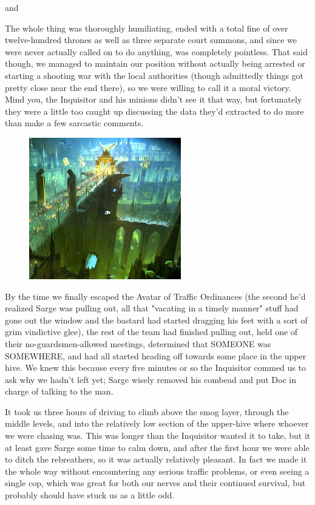 and


The whole thing was thoroughly humiliating, ended with a total fine of over twelve-hundred thrones as well as three separate court summons, and since we were never actually called on to do anything, was completely pointless. 
That said though, we managed to maintain our position without actually being arrested or starting a shooting war with the local authorities (though admittedly things got pretty close near the end there), so we were willing to call it a moral victory. 
Mind you, the Inquisitor and his minions didn't see it that way, but fortunately they were a little too caught up discussing the data they'd extracted to do more than make a few sarcastic comments.

\begin{figure}
	\begin{center}
		\includegraphics[width=\figwidth]{pics/17/41.png}
	\end{center}
\end{figure}
By the time we finally escaped the Avatar of Traffic Ordinances (the second he'd realized Sarge was pulling out, all that "vacating in a timely manner" stuff had gone out the window and the bastard had started dragging his feet with a sort of grim vindictive glee), the rest of the team had finished pulling out, held one of their no-guardsmen-allowed meetings, determined that SOMEONE was SOMEWHERE, and had all started heading off towards some place in the upper hive. 
We knew this because every five minutes or so the Inquisitor commed us to ask why we hadn't left yet; 
Sarge wisely removed his combead and put Doc in charge of talking to the man.

It took us three hours of driving to climb above the smog layer, through the middle levels, and into the relatively low section of the upper-hive where whoever we were chasing was. 
This was longer than the Inquisitor wanted it to take, but it at least gave Sarge some time to calm down, and after the first hour we were able to ditch the rebreathers, so it was actually relatively pleasant. 
In fact we made it the whole way without encountering any serious traffic problems, or even seeing a single cop, which was great for both our nerves and their continued survival, but probably should have stuck us as a little odd. 


